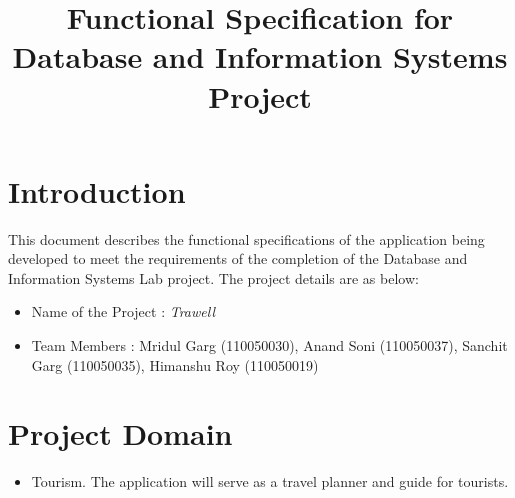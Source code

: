 \documentclass[11pt]{article}
\title{Functional Specification for Database and Information Systems Project}
\begin{document}
\maketitle
\section{Introduction}
This document describes the functional specifications of the application being developed to meet the requirements of the completion of the Database and Information Systems Lab project. The project details are as below: 
\begin{itemize}
\item Name of the Project : \emph{Trawell}
\item Team Members : Mridul Garg (110050030), Anand Soni (110050037), Sanchit Garg (110050035), Himanshu Roy (110050019) 
\end{itemize}

\section{Project Domain}
\begin{itemize}
\item Tourism. The application will serve as a travel planner and guide for tourists. 
\end{itemize}
\end{document}
